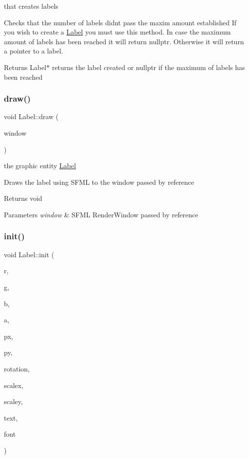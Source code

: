 that creates labels

Checks that the number of labels didn\textquotesingle{}t pass the maxim amount established If you wish to create a \hyperlink{class_label}{Label} you must use this method. In case the maximum amount of labels has been reached it will return nullptr. Otherwise it will return a pointer to a label.

\begin{DoxyReturn}{Returns}
Label$\ast$ returns the label created or nullptr if the maximum of labels has been reached 
\end{DoxyReturn}
\mbox{\label{class_label_acaf5dfeeab3e46b5795b8cd24c9d94fe}} 
\subsubsection{\texorpdfstring{draw()}{draw()}}
{\footnotesize\ttfamily void Label\+::draw (\begin{DoxyParamCaption}\item[{sf\+::\+Render\+Window \&}]{window }\end{DoxyParamCaption})}

the graphic entity \hyperlink{class_label}{Label}

Draws the label using S\+F\+ML to the window passed by reference

\begin{DoxyReturn}{Returns}
void 
\end{DoxyReturn}

\begin{DoxyParams}{Parameters}
{\em window} & S\+F\+ML Render\+Window passed by reference \\
\hline
\end{DoxyParams}
\mbox{\label{class_label_ab69dd0268124ac21d55b87734fd282a0}} 
\subsubsection{\texorpdfstring{init()}{init()}}
{\footnotesize\ttfamily void Label\+::init (\begin{DoxyParamCaption}\item[{const uint8\+\_\+t}]{r,  }\item[{const uint8\+\_\+t}]{g,  }\item[{const uint8\+\_\+t}]{b,  }\item[{const uint8\+\_\+t}]{a,  }\item[{const float}]{px,  }\item[{const float}]{py,  }\item[{const float}]{rotation,  }\item[{const float}]{scalex,  }\item[{const float}]{scaley,  }\item[{const char $\ast$}]{text,  }\item[{const sf\+::\+Font \&}]{font }\end{DoxyParamCaption})}

